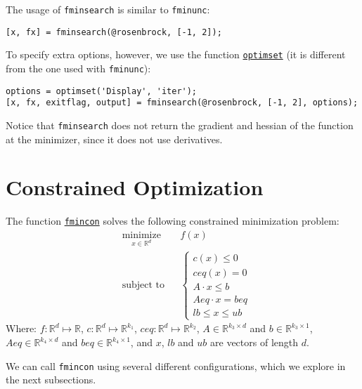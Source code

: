 \documentclass[12pt, a4paper]{article}
\begin{document}
The usage of \texttt{fminsearch} is similar to \texttt{fminunc}:
\lstset{language=matlab,label= ,caption= ,captionpos=b,firstnumber=1,numbers=left,style=Matlab-editor}
\begin{lstlisting}
[x, fx] = fminsearch(@rosenbrock, [-1, 2]);
\end{lstlisting}

To specify extra options, however, we use the function \href{https://www.mathworks.com/help/matlab/ref/optimset.html}{\texttt{optimset}} (it is different from the one used with \texttt{fminunc}):
\lstset{language=matlab,label= ,caption= ,captionpos=b,firstnumber=1,numbers=left,style=Matlab-editor}
\begin{lstlisting}
options = optimset('Display', 'iter');
[x, fx, exitflag, output] = fminsearch(@rosenbrock, [-1, 2], options);
\end{lstlisting}
Notice that \texttt{fminsearch} does not return the gradient and hessian of the function at the minimizer, since it does not use derivatives.
\section{Constrained Optimization}
\label{sec:org5bcde58}
The function \href{https://www.mathworks.com/help/optim/ug/fmincon.html?s\_tid=doc\_ta}{\texttt{fmincon}} solves the following constrained minimization problem:
\begin{equation*}
\begin{aligned}
& \underset{x\in\mathbb{R}^d}{\text{minimize}} & & f(x)\\
& \text{subject to} & & \begin{cases}
c(x) \leq 0\\
{ceq}(x) = 0\\
A\cdot x\leq b\\
{Aeq}\cdot x = {beq}\\
lb \leq x \leq ub
\end{cases}
\end{aligned}
\end{equation*}
Where: \(f:\mathbb{R}^d\mapsto\mathbb{R}\), \(c:\mathbb{R}^d\mapsto\mathbb{R}^{k_1}\), \({ceq}:\mathbb{R}^d\mapsto\mathbb{R}^{k_2}\), \(A\in\mathbb{R}^{k_3\times d}\) and \(b\in\mathbb{R}^{k_3\times 1}\), \({Aeq}\in\mathbb{R}^{k_4\times d}\) and \({beq}\in\mathbb{R}^{k_4\times 1}\), and \(x\), \(lb\) and \(ub\) are vectors of length \(d\).

We can call \texttt{fmincon} using several different configurations, which we explore in the next subsections.
\end{document}
